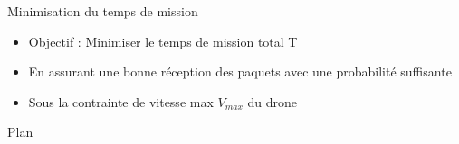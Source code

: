 \begin{frame}{Minimisation du temps de mission}


\begin{itemize}
	\item Objectif : Minimiser le temps de mission total T
	\item En assurant une bonne réception des paquets avec une probabilité suffisante
	\item Sous la contrainte de vitesse max \( V_{max} \) du drone 
\end{itemize}

\end{frame}


\newcommand{\asuivre}{\setcounter{sauvegardeenumi}{\theenumi}}
\newcommand{\suite}{\setcounter{enumi}{\thesauvegardeenumi}}

% 
% 	
% 
% 	
% 
%  
% 
% 
% 


\begin{frame}{Plan}
	\tableofcontents
\end{frame}
